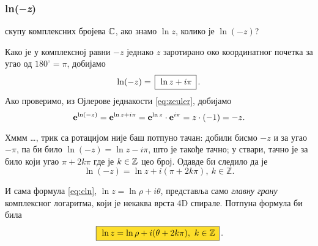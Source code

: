\subsubsection{ln($-$\textit{z})}

\zadatak 
\У скупу комплексних бројева ${\mathbb C}$, ако знамо $\ln z$,
колико је $\ln(-z)$?

\resenje 
Како је у комплексној равни $-z$ једнако $z$ заротирано
око координатног почетка
за угао од $180^\circ=\pi$, добијамо
$$
\ln (-z) = \ram{\ln z +i\pi}.
$$ 
Ако проверимо, из Ојлерове једнакости \eqref{eq:zeuler}, добијамо
$$
{\bf e}^{\ln(-z)} = {\bf e}^{\ln z+i\pi} = {\bf e}^{\ln z}\cdot {\bf e}^{i\pi}=z \cdot (-1)=-z.
$$

\dodatak Хммм \dots, трик са ротацијом није баш потпуно тачан: добили бисмо $-z$ и за угао $-\pi$,
па би било $\ln(-z)=\ln z-i\pi$, што је такође тачно;
у ствари, тачно је за било који угао $\pi+2k\pi$ где је $k\in{\mathbb Z}$ цео број. Одавде би следило да је
$$
\ln(-z) = \ln z + i(\pi+2k\pi),\ k\in{\mathbb Z}.
$$

И сама формула \eqref{eq:cln}, $\ln z=\ln\rho + i\theta$, представља само {\sl главну грану\/}
комплексног логаритма, који је некаква врста 4D спирале. Потпуна формула би била
\begin{equation}
    \okvir{\ln z=\ln\rho + i(\theta + 2k\pi),\ k\in\Zset} .
\end{equation}
